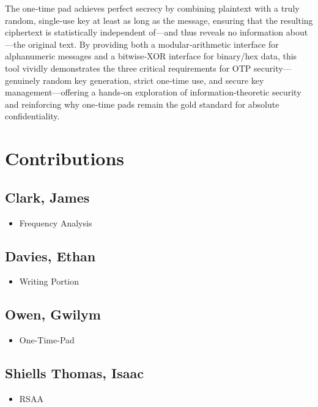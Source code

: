 \documentclass[11pt]{article}
\begin{document}
\begin{multicols}{2}
\begin{spacing}{1.125}
		The one‑time pad achieves perfect secrecy by combining plaintext with a truly random, single‑use key at least as long as the message, ensuring that the resulting ciphertext is statistically independent of—and thus reveals no information about—the original text. By providing both a modular‑arithmetic interface for alphanumeric messages and a bitwise‑XOR interface for binary/hex data, this tool vividly demonstrates the three critical requirements for OTP security—genuinely random key generation, strict one‑time use, and secure key management—offering a hands‑on exploration of information‑theoretic security and reinforcing why one‑time pads remain the gold standard for absolute confidentiality.


		\section{Contributions}
		\subsection{Clark, James}
		\begin{itemize}
			\item Frequency Analysis
		\end{itemize}
		\subsection{Davies, Ethan}
		\begin{itemize}
			\item Writing Portion
		\end{itemize}
		\subsection{Owen, Gwilym}
		\begin{itemize}
			\item One-Time-Pad
		\end{itemize}
		\subsection{Shiells Thomas, Isaac}
		\begin{itemize}
			\item RSAA
		\end{itemize}

		\printbibliography

	\end{spacing}
\end{multicols}
\end{document}
